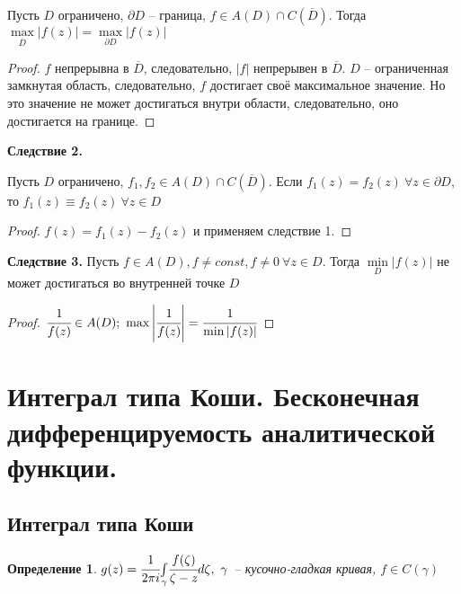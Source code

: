 \documentclass[draft]{report}
\newcommand{\dd}{\partial}
\newcommand{\mint}[2]{\underset{#1}{\overset{#2}{\int}}}
\newcommand{\mmax}[1]{\underset{#1}{\max}}
\newcommand{\mmin}[1]{\underset{#1}{\min}}
\renewcommand{\bar}{\overline}
\newcommand{\g}{\gamma}
\newcommand{\F}{\ \forall}
\newcommand{\opr}[1]{\begin{opred}#1\end{opred}}
\newtheorem*{opred}{Определение}
\theoremstyle{remark}
\begin{document}
Пусть $D$ ограничено, $\dd D$ -- граница, $f\in A(D)\cap C(\bar{D})$. Тогда $\mmax{\bar{D}}|f(z)|=\mmax{\dd D}|f(z)|$
\begin{proof}
$f$ непрерывна в $\bar{D}$, следовательно, $|f|$ непрерывен в $\bar{D}$. $D$ -- ограниченная замкнутая область, следовательно, $f$ достигает своё максимальное значение. Но это значение не может достигаться внутри области, следовательно, оно достигается на границе.
\end{proof}
{\bfseries Следствие 2.}

Пусть $D$ ограничено, $f_1,f_2\in A(D)\cap C(\bar{D})$. Если $f_1(z)=f_2(z)\F z\in\dd D$, то $f_1(z)\equiv f_2(z)\F z\in D$
\begin{proof}
$f(z)=f_1(z)-f_2(z)$ и применяем следствие 1.
\end{proof}
{\bfseries Следствие 3.}
Пусть $f\in  A(D),f\neq const,f\neq 0\F z\in D$. Тогда $\mmin{D}|f(z)|$ не может достигаться во внутренней точке $D$
\begin{proof}
$\cfrac{1}{f(z)}\in A(D);\ \max\left|\cfrac{1}{f(z)}\right|=\cfrac{1}{\min|f(z)|}$
\end{proof}

\section{Интеграл типа Коши. Бесконечная дифференцируемость аналитической функции.}

\subsection{Интеграл типа Коши}

\opr{$g(z)=\cfrac 1{2\pi i}\mint{\g}{}\cfrac{f(\zeta)}{\zeta-z}d\zeta,\ \g$ -- кусочно-гладкая кривая, $f\in C(\g)$}
\end{document}
